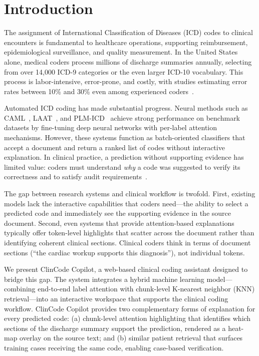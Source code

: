 \documentclass[conference]{IEEEtran}
\begin{document}
\section{Introduction}

The assignment of International Classification of Diseases (ICD) codes to clinical encounters is fundamental to healthcare operations, supporting reimbursement, epidemiological surveillance, and quality measurement. In the United States alone, medical coders process millions of discharge summaries annually, selecting from over 14,000 ICD-9 categories or the even larger ICD-10 vocabulary. This process is labor-intensive, error-prone, and costly, with studies estimating error rates between 10\% and 30\% even among experienced coders~\cite{b_omalley2005, b_burns2012}.

Automated ICD coding has made substantial progress. Neural methods such as CAML~\cite{b_mullenbach2018}, LAAT~\cite{b_vu2020}, and PLM-ICD~\cite{b_plmicd} achieve strong performance on benchmark datasets by fine-tuning deep neural networks with per-label attention mechanisms. However, these systems function as batch-oriented classifiers that accept a document and return a ranked list of codes without interactive explanation. In clinical practice, a prediction without supporting evidence has limited value: coders must understand \emph{why} a code was suggested to verify its correctness and to satisfy audit requirements~\cite{b_topaz2013}.

The gap between research systems and clinical workflow is twofold. First, existing models lack the interactive capabilities that coders need---the ability to select a predicted code and immediately see the supporting evidence in the source document. Second, even systems that provide attention-based explanations typically offer token-level highlights that scatter across the document rather than identifying coherent clinical sections. Clinical coders think in terms of document sections (``the cardiac workup supports this diagnosis''), not individual tokens.

We present ClinCode Copilot, a web-based clinical coding assistant designed to bridge this gap. The system integrates a hybrid machine learning model---combining end-to-end label attention with chunk-level K-nearest neighbor (KNN) retrieval---into an interactive workspace that supports the clinical coding workflow. ClinCode Copilot provides two complementary forms of explanation for every predicted code: (a) chunk-level attention highlighting that identifies which sections of the discharge summary support the prediction, rendered as a heat-map overlay on the source text; and (b) similar patient retrieval that surfaces training cases receiving the same code, enabling case-based verification.
\end{document}
